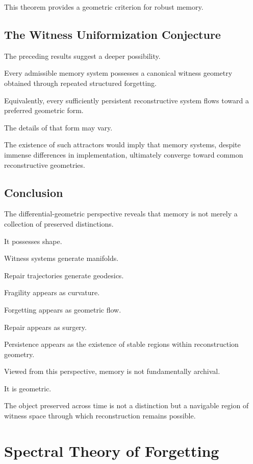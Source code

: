 \documentclass[12pt,oneside]{book}
\theoremstyle{plain} \newtheorem{theorem}{Theorem}[chapter] \newtheorem{lemma}[theorem]{Lemma} \newtheorem{proposition}[theorem]{Proposition} \newtheorem{corollary}[theorem]{Corollary}
\theoremstyle{definition} \newtheorem{definition}[theorem]{Definition} \newtheorem{axiom}[theorem]{Axiom} \newtheorem{construction}[theorem]{Construction}
\theoremstyle{remark} \newtheorem{remark}[theorem]{Remark} \newtheorem{example}[theorem]{Example}
\begin{document}
This theorem provides a geometric criterion for robust memory.

\section{The Witness Uniformization Conjecture}

The preceding results suggest a deeper possibility.

\begin{conjecture}

Every admissible memory system possesses a canonical witness geometry obtained through repeated structured forgetting.

\end{conjecture}

Equivalently, every sufficiently persistent reconstructive system flows toward a preferred geometric form.

The details of that form may vary.

The existence of such attractors would imply that memory systems, despite immense differences in implementation, ultimately converge toward common reconstructive geometries.

\section{Conclusion}

The differential-geometric perspective reveals that memory is not merely a collection of preserved distinctions.

It possesses shape.

Witness systems generate manifolds.

Repair trajectories generate geodesics.

Fragility appears as curvature.

Forgetting appears as geometric flow.

Repair appears as surgery.

Persistence appears as the existence of stable regions within reconstruction geometry.

Viewed from this perspective, memory is not fundamentally archival.

It is geometric.

The object preserved across time is not a distinction but a navigable region of witness space through which reconstruction remains possible.

\chapter{Spectral Theory of Forgetting}
\end{document}
